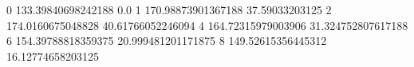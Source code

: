 0 133.39840698242188 0.0
1 170.98873901367188 37.59033203125
2 174.0160675048828 40.61766052246094
4 164.72315979003906 31.324752807617188
6 154.39788818359375 20.999481201171875
8 149.52615356445312 16.12774658203125

